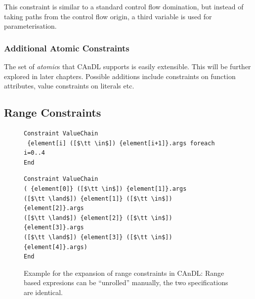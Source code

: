     \noindent
    This constraint is similar to a standard control flow domination, but
    instead of taking paths from the control flow origin, a third variable is
    used for parameterisation. 

\subsubsection*{Additional Atomic Constraints}

    The set of {\it atomic}s that CAnDL supports is easily extensible.
    This will be further explored in later chapters.
    Possible additions include constraints on function attributes, value
    constraints on literals etc.

\subsection{Range Constraints}

\begin{figure}[t]
\begin{lstlisting}[language=CAnDL]
Constraint ValueChain
 {element[i] ([$\tt \in$]) {element[i+1]}.args foreach i=0..4
End
\end{lstlisting}
\begin{lstlisting}[language=CAnDL]
Constraint ValueChain
( {element[0]} ([$\tt \in$]) {element[1]}.args
([$\tt \land$]) {element[1]} ([$\tt \in$]) {element[2]}.args
([$\tt \land$]) {element[2]} ([$\tt \in$]) {element[3]}.args
([$\tt \land$]) {element[3]} ([$\tt \in$]) {element[4]}.args)
End
\end{lstlisting}
\vspace{-0.3cm}
\caption{Example for the expansion of range constraints in CAnDL:
         Range based expresions can be ``unrolled'' manually, the two
         specifications are identical.}
\label{fig:forall}
\end{figure}


